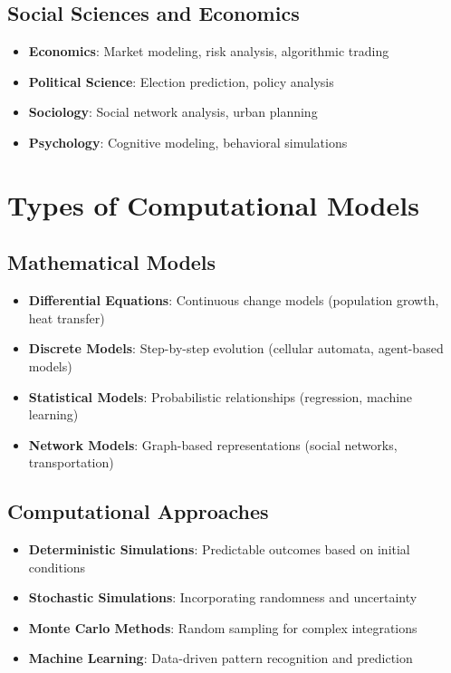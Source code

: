 \subsection{Social Sciences and Economics}
\begin{itemize}
  \item \textbf{Economics}: Market modeling, risk analysis, algorithmic trading
  \item \textbf{Political Science}: Election prediction, policy analysis
  \item \textbf{Sociology}: Social network analysis, urban planning
  \item \textbf{Psychology}: Cognitive modeling, behavioral simulations
\end{itemize}

\section{Types of Computational Models}

\subsection{Mathematical Models}
\begin{itemize}
  \item \textbf{Differential Equations}: Continuous change models (population growth, heat transfer)
  \item \textbf{Discrete Models}: Step-by-step evolution (cellular automata, agent-based models)
  \item \textbf{Statistical Models}: Probabilistic relationships (regression, machine learning)
  \item \textbf{Network Models}: Graph-based representations (social networks, transportation)
\end{itemize}

\subsection{Computational Approaches}
\begin{itemize}
  \item \textbf{Deterministic Simulations}: Predictable outcomes based on initial conditions
  \item \textbf{Stochastic Simulations}: Incorporating randomness and uncertainty
  \item \textbf{Monte Carlo Methods}: Random sampling for complex integrations
  \item \textbf{Machine Learning}: Data-driven pattern recognition and prediction
\end{itemize}

